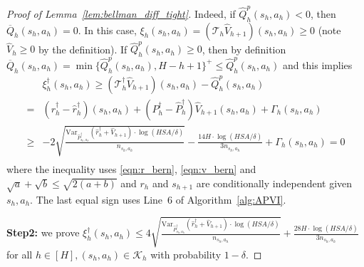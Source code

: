 \begin{proof}[Proof of Lemma~\ref{lem:bellman_diff_tight}]
	Indeed, if $\widehat{Q}^p_h(s_h,a_h)<0$, then $\overline{Q}_h(s_h,a_h)=0$. In this case, $\xi_h(s_h,a_h)=(\mathcal{T}_h\widehat{V}_{h+1})(s_h,a_h)\geq 0$ (note $\widehat{V}_{h}\geq 0$ by the definition). If $\widehat{Q}^p_h(s_h,a_h)\geq 0$, then by definition $\overline{Q}_h(s_h,a_h)=\min\{\widehat{Q}^p_h(s_h,a_h),H-h+1\}^+\leq \widehat{Q}^p_h(s_h,a_h)$ and this implies
	\begin{align*}
	&\xi^\dagger_h(s_h,a_h)\geq (\mathcal{T}^\dagger_h\widehat{V}_{h+1})(s_h,a_h)-\widehat{Q}^p_h(s_h,a_h)\\
	=&(r^\dagger_h-\widehat{r}^\dagger_h)(s_h,a_h)+(P^\dagger_h-\widehat{P}^\dagger_h)\widehat{V}_{h+1}(s_h,a_h)+\Gamma_h(s_h,a_h)\\
	\geq &-2\sqrt{\frac{\mathrm{Var}_{\widehat{P}^\dagger_{s_h,a_h}}(\widehat{r}^\dagger_h+\widehat{V}_{h+1})\cdot\log(HSA/\delta)}{n_{s_h,a_h}}}-\frac{14H\cdot\log(HSA/\delta)}{3n_{s_h,a_h}}+\Gamma_h(s_h,a_h)=0\\
	\end{align*}
	where the inequality uses \eqref{eqn:r_bern}, \eqref{eqn:v_bern} and $\sqrt{a}+\sqrt{b}\leq \sqrt{2(a+b)}$ and $r_h$ and $s_{h+1}$ are conditionally independent given $s_h,a_h$.
	The last equal sign uses Line~6 of Algorithm~\ref{alg:APVI}.
	
	\textbf{Step2:} we prove $\xi^\dagger_h(s_h,a_h)
	\leq 4\sqrt{\frac{\mathrm{Var}_{\widehat{P}^\dagger_{s_h,a_h}}(\widehat{r}^\dagger_h+\widehat{V}_{h+1})\cdot\log(HSA/\delta)}{n_{s_h,a_h}}}+\frac{28H\cdot\log(HSA/\delta)}{3n_{s_h,a_h}}$ for all $h\in[H],(s_h,a_h)\in\mathcal{K}_h$ with probability $1-\delta$.
	

\end{proof}
